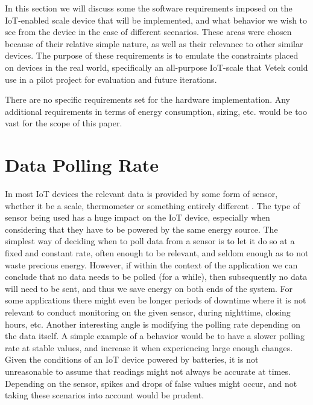 





In this section we will discuss some the software requirements imposed on the IoT-enabled scale device that will be implemented, and what behavior we wish to see from the device in the case of different scenarios. These areas were chosen because of their relative simple nature, as well as their relevance to other similar devices. The purpose of these requirements is to emulate the constraints placed on devices in the real world, specifically an all-purpose IoT-scale that Vetek could use in a pilot project for evaluation and future iterations. 

There are no specific requirements set for the hardware implementation. Any additional requirements in terms of energy consumption, sizing, etc. would be too vast for the scope of this paper. 

\section{Data Polling Rate}
In most IoT devices the relevant data is provided by some form of sensor, whether it be a scale, thermometer or something entirely different \cite{what_is_iot}. The type of sensor being used has a huge impact on the IoT device, especially when considering that they have to be powered by the same energy source. The simplest way of deciding when to poll data from a sensor is to let it do so at a fixed and constant rate, often enough to be relevant, and seldom enough as to not waste precious energy. However, if within the context of the application we can conclude that no data needs to be polled (for a while), then subsequently no data will need to be sent, and thus we save energy on both ends of the system. For some applications there might even be longer periods of downtime where it is not relevant to conduct monitoring on the given sensor, \eg during nighttime, closing hours, etc. Another interesting angle is modifying the polling rate depending on the data itself. A simple example of a behavior would be to have a slower polling rate at stable values, and increase it when experiencing large enough changes. Given the conditions of an IoT device powered by batteries, it is not unreasonable to assume that readings might not always be accurate at times. Depending on the sensor, spikes and drops of false values might occur, and not taking these scenarios into account would be prudent. 

